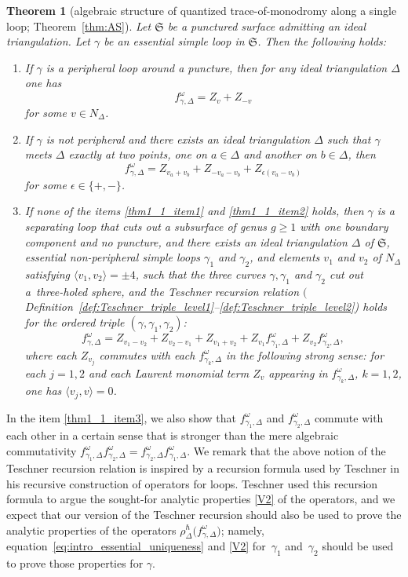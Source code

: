 \documentclass[10pt,a4paper]{amsart}
\numberwithin{equation}{section}
\newtheorem{Theorem}{Theorem}[section]
\theoremstyle{definition}
\begin{document}
\begin{Theorem}[algebraic structure of quantized trace-of-monodromy along a single loop; Theorem~\ref{thm:AS}]
\label{thm:main1}
Let $\mathfrak{S}$ be a punctured surface admitting an ideal triangulation. Let $\gamma$ be an essential simple loop in $\mathfrak{S}$. Then the following holds:
\begin{enumerate}[label={\rm (\arabic*)}]\itemsep=0pt
\item\label{thm1_1_item1} If $\gamma$ is a peripheral loop around a puncture, then for any ideal triangulation $\Delta$ one has
\[
f^\omega_{\gamma,\Delta} = Z_v + Z_{-v}
\]
for some $v\in N_\Delta$.
\item\label{thm1_1_item2} If $\gamma$ is not peripheral and there exists an ideal triangulation $\Delta$ such that $\gamma$ meets $\Delta$ exactly at two points, one on $a\in \Delta$ and another on $b\in \Delta$, then
\[
f^\omega_{\gamma,\Delta} = Z_{v_a+v_b} +Z_{-v_a-v_b} + Z_{\epsilon(v_a-v_b)}
\]
for some $\epsilon \in \{+,-\}$.
\item\label{thm1_1_item3} If none of the items {\rm \ref{thm1_1_item1}} and {\rm \ref{thm1_1_item2}} holds, then $\gamma$ is a separating loop that cuts out a subsurface of genus $g\ge 1$ with one boundary component and no puncture, and there exists an ideal triangulation $\Delta$ of $\mathfrak{S}$, essential non-peripheral simple loops $\gamma_1$ and $\gamma_2$, and elements $v_1$ and $v_2$ of $N_\Delta$ satisfying $\langle v_1,v_2\rangle =\pm 4$, such that the three curves $\gamma,\gamma_1$ and $\gamma_2$ cut out a~three-holed sphere, and the {\em Teschner recursion relation} $($Definition~{\rm \ref{def:Teschner_triple_level1}--\ref{def:Teschner_triple_level2})} holds for the ordered triple $(\gamma,\gamma_1,\gamma_2)$:
\[
f^\omega_{\gamma,\Delta} = Z_{ v_1 - v_2} + Z_{v_2 - v_1} + Z_{v_1 + v_2} + Z_{v_1} f^\omega_{\gamma_1,\Delta} + Z_{v_2} f^\omega_{\gamma_2,\Delta},
\]
where each $Z_{v_j}$ commutes with each $f^\omega_{\gamma_k,\Delta}$ in the following strong sense: for each $j=1,2$ and each Laurent monomial term $Z_v$ appearing in $f^\omega_{\gamma_k,\Delta}$, $k=1,2$, one has $\langle v_j, v\rangle=0$.
\end{enumerate}
\end{Theorem}
In the item \ref{thm1_1_item3}, we also show that $f^\omega_{\gamma_1,\Delta}$ and $f^\omega_{\gamma_2,\Delta}$ commute with each other in a certain sense that is stronger than the mere algebraic commutativity $f^\omega_{\gamma_1,\Delta}f^\omega_{\gamma_2,\Delta}=f^\omega_{\gamma_2,\Delta}f^\omega_{\gamma_1,\Delta}$. We remark that the above notion of the Teschner recursion relation is inspired by a recursion formula \cite[equation~(15.5) of Definition~6]{T} used by Teschner in his recursive construction of operators for loops. Teschner used this recursion formula to argue the sought-for analytic properties \ref{V2} of the operators, and we expect that our version of the Teschner recursion should also be used to prove the analytic properties of the operators $\rho^\hbar_\Delta\bigl(f^\omega_{\gamma,\Delta}\bigr)$; namely, equation~\eqref{eq:intro_essential_uniqueness} and \ref{V2} for~$\gamma_1$ and~$\gamma_2$ should be used to prove those properties for $\gamma$.
\end{document}
